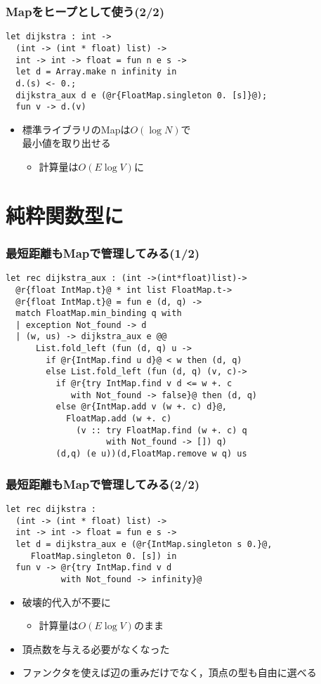 \documentclass[dvipdfmx,cjk,xcolor=dvipsnames,envcountsect,notheorems,12pt]{beamer}
\theoremstyle{definition}
\begin{document}
\begin{frame}[fragile]
	\frametitle{Mapをヒープとして使う(2/2)}
	\begin{lstlisting}
let dijkstra : int ->
  (int -> (int * float) list) ->
  int -> int -> float = fun n e s ->
  let d = Array.make n infinity in
  d.(s) <- 0.;
  dijkstra_aux d e (@r{FloatMap.singleton 0. [s]}@);
  fun v -> d.(v)
\end{lstlisting}
	\begin{itemize}
		\item 標準ライブラリのMapは$O(\log N)$で\\最小値を取り出せる
			\begin{itemize}
				\item 計算量は$O(E \log V)$に
			\end{itemize}
	\end{itemize}
\end{frame}

\section{純粋関数型に}

\begin{frame}[fragile]
	\frametitle{最短距離もMapで管理してみる(1/2)}
	\begin{lstlisting}
let rec dijkstra_aux : (int ->(int*float)list)->
  @r{float IntMap.t}@ * int list FloatMap.t->
  @r{float IntMap.t}@ = fun e (d, q) ->
  match FloatMap.min_binding q with
  | exception Not_found -> d
  | (w, us) -> dijkstra_aux e @@
      List.fold_left (fun (d, q) u ->
        if @r{IntMap.find u d}@ < w then (d, q)
        else List.fold_left (fun (d, q) (v, c)->
          if @r{try IntMap.find v d <= w +. c
             with Not_found -> false}@ then (d, q)
          else @r{IntMap.add v (w +. c) d}@,
            FloatMap.add (w +. c)
              (v :: try FloatMap.find (w +. c) q
                    with Not_found -> []) q)
          (d,q) (e u))(d,FloatMap.remove w q) us
\end{lstlisting}
\end{frame}

\begin{frame}[fragile]
	\frametitle{最短距離もMapで管理してみる(2/2)}
	\begin{lstlisting}
let rec dijkstra :
  (int -> (int * float) list) ->
  int -> int -> float = fun e s ->
  let d = dijkstra_aux e (@r{IntMap.singleton s 0.}@,
     FloatMap.singleton 0. [s]) in
  fun v -> @r{try IntMap.find v d
           with Not_found -> infinity}@
\end{lstlisting}
	\begin{itemize}
		\item 破壊的代入が不要に
			\begin{itemize}
				\item 計算量は$O(E \log V)$のまま
			\end{itemize}
		\item 頂点数を与える必要がなくなった
		\item ファンクタを使えば辺の重みだけでなく，頂点の型も自由に選べる
	\end{itemize}
\end{frame}
\end{document}
